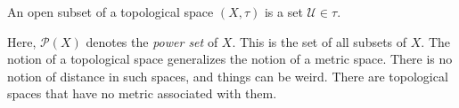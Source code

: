 \documentclass[crop=false,class=article,oneside]{standalone}
\begin{document}
            \begin{definition}
                An open subset of a topological space
                $(X,\tau)$ is a set $\mathcal{U}\in\tau$.
            \end{definition}
            Here, $\mathcal{P}(X)$ denotes the \textit{power set}
            of $X$. This is the set of all subsets of $X$.
            The notion of a topological space generalizes the
            notion of a metric space. There is no notion of
            distance in such spaces, and things can be weird.
            There are topological spaces that have no metric
            associated with them.
\end{document}
